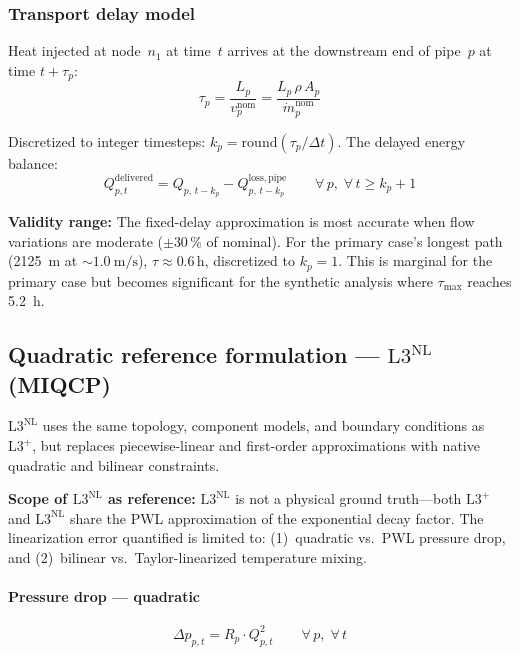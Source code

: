 \documentclass[review,3p]{elsarticle}
\newcommand{\Lplus}{\mathrm{L3}^{+}}
\newcommand{\Lnl}{\mathrm{L3}^{\mathrm{NL}}}
\begin{document}
\subsubsection{Transport delay model}
\label{sec:model_delay}

Heat injected at node~$n_1$ at time~$t$ arrives at the downstream end
of pipe~$p$ at time $t + \tau_p$:
%
\begin{equation}
  \tau_p = \frac{L_p}{v_p^{\mathrm{nom}}}
         = \frac{L_p\, \rho\, A_p}{\dot{m}_p^{\mathrm{nom}}}
  \label{eq:delay}
\end{equation}

Discretized to integer timesteps:
$k_p = \mathrm{round}(\tau_p / \Delta t)$. The delayed energy
balance:
\begin{equation}
  Q_{p,t}^{\mathrm{delivered}} =
    Q_{p,\,t-k_p} - Q_{p,\,t-k_p}^{\mathrm{loss,pipe}}
  \qquad \forall\, p,\; \forall\, t \geq k_p + 1
  \label{eq:delayed_balance}
\end{equation}

\textbf{Validity range:} The fixed-delay approximation is most
accurate when flow variations are moderate ($\pm 30\,\%$ of nominal).
For the primary case's longest path (\SI{2125}{\metre} at
${\sim}\SI{1.0}{\metre\per\second}$), $\tau \approx 0.6$\,h,
discretized to $k_p = 1$. This is marginal for the primary case but
becomes significant for the synthetic analysis where $\tau_{\max}$
reaches \SI{5.2}{\hour}.

\subsection{Quadratic reference formulation --- $\Lnl$ (MIQCP)}
\label{sec:miqcp}

$\Lnl$ uses the same topology, component models, and boundary
conditions as $\Lplus$, but replaces piecewise-linear and first-order
approximations with native quadratic and bilinear constraints.

\textbf{Scope of $\Lnl$ as reference:} $\Lnl$ is not a physical
ground truth---both $\Lplus$ and $\Lnl$ share the PWL approximation
of the exponential decay factor. The linearization error quantified is
limited to: (1)~quadratic vs.\ PWL pressure drop, and (2)~bilinear
vs.\ Taylor-linearized temperature mixing.

\paragraph{Pressure drop --- quadratic}
\begin{equation}
  \Delta p_{p,t} = R_p \cdot Q_{p,t}^2
  \qquad \forall\, p,\; \forall\, t
  \label{eq:darcy_quad}
\end{equation}
\end{document}
